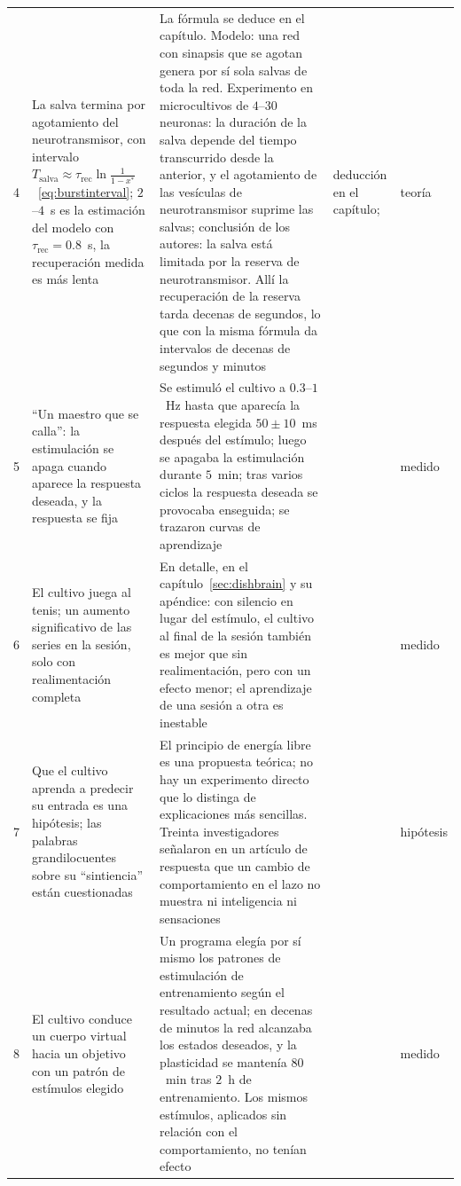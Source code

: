 {\begin{longtable}{>{\raggedright}p{0.5cm}>{\raggedright}p{4.0cm}>{\raggedright}p{5.6cm}>{\raggedright}p{2.3cm}>{\raggedright\arraybackslash}p{1.7cm}}
4 & La salva termina por agotamiento del neurotransmisor, con intervalo $T_{\text{salva}}\approx\tau_{\text{rec}}\ln\frac{1}{1-x^*}$~\eqref{eq:burstinterval}; $2$--$4$~s es la estimación del modelo con $\tau_{\text{rec}}=0.8$~s, la recuperación medida es más lenta & La fórmula se deduce en el capítulo. Modelo: una red con sinapsis que se agotan genera por sí sola salvas de toda la red. Experimento en microcultivos de $4$--$30$ neuronas: la duración de la salva depende del tiempo transcurrido desde la anterior, y el agotamiento de las vesículas de neurotransmisor suprime las salvas; conclusión de los autores: la salva está limitada por la reserva de neurotransmisor. Allí la recuperación de la reserva tarda decenas de segundos, lo que con la misma fórmula da intervalos de decenas de segundos y minutos & deducción en el capítulo; \cite{Tsodyks2000,CohenSegal2011,Tsodyks1997} & teoría \\
5 & “Un maestro que se calla”: la estimulación se apaga cuando aparece la respuesta deseada, y la respuesta se fija & Se estimuló el cultivo a $0.3$--$1$~Hz hasta que aparecía la respuesta elegida $50\pm10$~ms después del estímulo; luego se apagaba la estimulación durante $5$~min; tras varios ciclos la respuesta deseada se provocaba enseguida; se trazaron curvas de aprendizaje & \cite{Shahaf2001} & medido \\
6 & El cultivo juega al tenis; un aumento significativo de las series en la sesión, solo con realimentación completa & En detalle, en el capítulo~\ref{sec:dishbrain} y su apéndice: con silencio en lugar del estímulo, el cultivo al final de la sesión también es mejor que sin realimentación, pero con un efecto menor; el aprendizaje de una sesión a otra es inestable & \cite{Kagan2022} & medido \\
7 & Que el cultivo aprenda a predecir su entrada es una hipótesis; las palabras grandilocuentes sobre su “sintiencia” están cuestionadas & El principio de energía libre es una propuesta teórica; no hay un experimento directo que lo distinga de explicaciones más sencillas. Treinta investigadores señalaron en un artículo de respuesta que un cambio de comportamiento en el lazo no muestra ni inteligencia ni sensaciones & \cite{Friston2010,Balci2023} & hipótesis \\
8 & El cultivo conduce un cuerpo virtual hacia un objetivo con un patrón de estímulos elegido & Un programa elegía por sí mismo los patrones de estimulación de entrenamiento según el resultado actual; en decenas de minutos la red alcanzaba los estados deseados, y la plasticidad se mantenía $80$~min tras $2$~h de entrenamiento. Los mismos estímulos, aplicados sin relación con el comportamiento, no tenían efecto & \cite{Bakkum2008} & medido \\

\end{longtable}}

